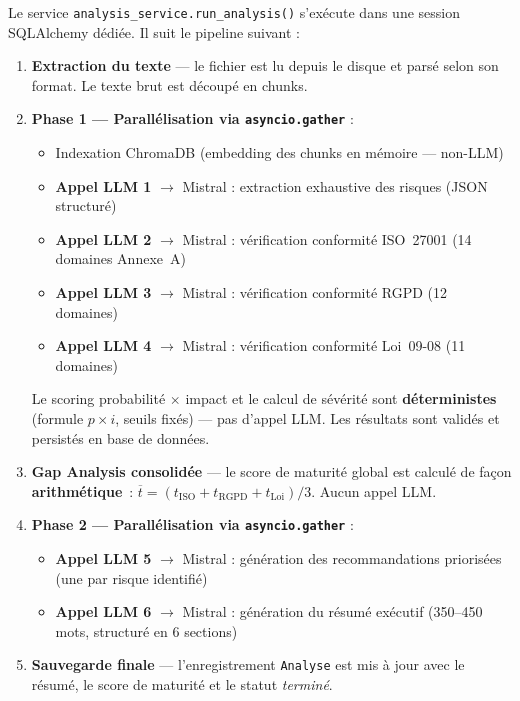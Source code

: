 \documentclass[a4paper,12pt,oneside]{report}
\begin{document}
	Le service \texttt{analysis\_service.run\_analysis()} s'exécute dans
	une session SQLAlchemy dédiée. Il suit le pipeline suivant :
	
	\begin{enumerate}
		\item \textbf{Extraction du texte} — le fichier est lu depuis le disque
		et parsé selon son format. Le texte brut est découpé en chunks.
		
		\item \textbf{Phase 1 — Parallélisation via \texttt{asyncio.gather}} :
		\begin{itemize}
			\item Indexation ChromaDB (embedding des chunks en mémoire --- non-LLM)
			\item \textbf{Appel LLM 1} $\to$ Mistral : extraction exhaustive des risques (JSON structur\'e)
			\item \textbf{Appel LLM 2} $\to$ Mistral : v\'erification conformit\'e ISO~27001 (14 domaines Annexe~A)
			\item \textbf{Appel LLM 3} $\to$ Mistral : v\'erification conformit\'e RGPD (12 domaines)
			\item \textbf{Appel LLM 4} $\to$ Mistral : v\'erification conformit\'e Loi~09-08 (11 domaines)
		\end{itemize}
		Le scoring probabilit\'e $\times$ impact et le calcul de s\'ev\'erit\'e sont
		\textbf{d\'eterministes} (formule $p \times i$, seuils fix\'es) --- pas d'appel LLM.
		Les r\'esultats sont valid\'es et persist\'es en base de donn\'ees.
		
		\item \textbf{Gap Analysis consolid\'ee} --- le score de maturit\'e global
		est calcul\'e de fa\c{c}on \textbf{arithm\'etique}~:
		$\overline{t} = (t_{\text{ISO}} + t_{\text{RGPD}} + t_{\text{Loi}}) / 3$.
		Aucun appel LLM.
		
		\item \textbf{Phase 2 --- Parall\'elisation via \texttt{asyncio.gather}} :
		\begin{itemize}
			\item \textbf{Appel LLM 5} $\to$ Mistral : g\'en\'eration des recommandations prioris\'ees
			(une par risque identifi\'e)
			\item \textbf{Appel LLM 6} $\to$ Mistral : g\'en\'eration du r\'esum\'e ex\'ecutif
			(350--450 mots, structur\'e en 6 sections)
		\end{itemize}
		
		\item \textbf{Sauvegarde finale} — l'enregistrement \texttt{Analyse}
		est mis à jour avec le résumé, le score de maturité et le statut
		\textit{terminé}.
	\end{enumerate}
	
\end{document}
